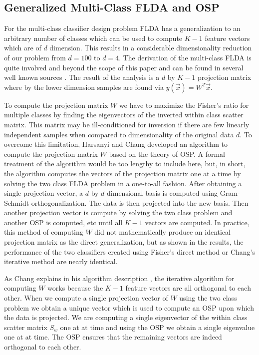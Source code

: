 \documentclass[journal]{IEEEtran}
\begin{document}
\subsection{Generalized Multi-Class FLDA and OSP}
\par For the multi-class classifier design problem FLDA has a generalization to an arbitrary number of classes which can be used to compute \(K-1\) feature vectors which are of \(d\) dimension. This results in a considerable dimensionality reduction of our problem from \(d=100\) to \(d=4\). The derivation of the multi-class FLDA is quite involved and beyond the scope of this paper and can be found in several well known sources \cite[p.~110-112]{bishop2}\cite[p~.121-124]{duda}. The result of the analysis is a \(d\) by \(K-1\) projection matrix where by the lower dimension samples are found via \(y(\vec{x}) = W^T\vec{x}\).
\par To compute the projection matrix \(W\) we have to maximize the Fisher's ratio for multiple classes by finding the eigenvectors of the inverted within class scatter matrix. This matrix may be ill-conditioned for inversion if there are few linearly independent samples when compared to dimensionality of the original data \(d\). To overcome this limitation, Harsanyi and Chang \cite[p.~47-48]{chang2} developed an algorithm to compute the projection matrix \(W\) based on the theory of OSP. A formal treatment of the algorithm would be too lengthy to include here, but, in short, the algorithm computes the vectors of the projection matrix one at a time by solving the two class FLDA problem in a one-to-all fashion. After obtaining a single projection vector, a \(d\) by \(d\) dimensional basis is computed using Gram-Schmidt orthogonalization. The data is then projected into the new basis. Then another projection vector is compute by solving the two class problem and another OSP is computed, etc until all \(K-1\) vectors are computed. In practice, this method of computing \(W\) did not mathematically produce an identical projection matrix as the direct generalization, but as shown in the results, the performance of the two classifiers created using Fisher's direct method or Chang's iterative method are nearly identical.
\par As Chang explains in his algorithm description \cite[p.48]{chang2}, the iterative algorithm for computing \(W\) works because the \(K-1\) feature vectors are all orthogonal to each other. When we compute a single projection vector of \(W\) using the two class problem we obtain a unique vector which is used to compute an OSP upon which the data is projected. We are computing a single eigenvector of the within class scatter matrix \(S_w\) one at at time and using the OSP we obtain a single eigenvalue one at at time. The OSP ensures that the remaining vectors are indeed orthogonal to each other.
\end{document}
